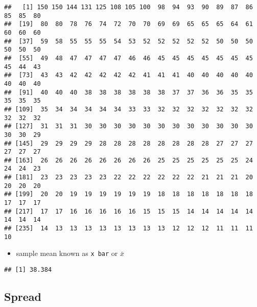 \documentclass[
]{book}
\newenvironment{Shaded}{\begin{snugshade}}{\end{snugshade}}
\newcommand{\AttributeTok}[1]{\textcolor[rgb]{0.77,0.63,0.00}{#1}}
\newcommand{\ConstantTok}[1]{\textcolor[rgb]{0.00,0.00,0.00}{#1}}
\newcommand{\FunctionTok}[1]{\textcolor[rgb]{0.00,0.00,0.00}{#1}}
\newcommand{\NormalTok}[1]{#1}
\newcommand{\SpecialCharTok}[1]{\textcolor[rgb]{0.00,0.00,0.00}{#1}}
\providecommand{\tightlist}{%
  \setlength{\itemsep}{0pt}\setlength{\parskip}{0pt}}
\theoremstyle{definition}
\theoremstyle{definition}
\theoremstyle{definition}
\theoremstyle{definition}
\theoremstyle{remark}
\begin{document}
\begin{Shaded}
\end{Shaded}

\begin{verbatim}
##   [1] 150 150 144 131 125 108 105 100  98  94  93  90  89  87  86  85  85  80
##  [19]  80  80  78  76  74  72  70  70  69  69  65  65  65  64  61  60  60  60
##  [37]  59  58  55  55  55  54  53  52  52  52  52  52  50  50  50  50  50  50
##  [55]  49  48  47  47  47  47  46  46  45  45  45  45  45  45  45  45  44  43
##  [73]  43  43  42  42  42  42  42  41  41  41  40  40  40  40  40  40  40  40
##  [91]  40  40  40  38  38  38  38  38  38  37  37  36  36  35  35  35  35  35
## [109]  35  34  34  34  34  34  33  33  32  32  32  32  32  32  32  32  32  32
## [127]  31  31  31  30  30  30  30  30  30  30  30  30  30  30  30  30  30  29
## [145]  29  29  29  29  28  28  28  28  28  28  28  28  27  27  27  27  27  27
## [163]  26  26  26  26  26  26  26  26  25  25  25  25  25  25  24  24  24  23
## [181]  23  23  23  23  23  22  22  22  22  22  22  21  21  21  20  20  20  20
## [199]  20  20  19  19  19  19  19  19  18  18  18  18  18  18  18  17  17  17
## [217]  17  17  16  16  16  16  16  15  15  15  14  14  14  14  14  14  14  14
## [235]  14  13  13  13  13  13  13  13  13  12  12  12  11  11  11  10
\end{verbatim}

\begin{itemize}
\tightlist
\item
  sample mean known as \texttt{x\ bar} or \(\bar{x}\)
\end{itemize}

\begin{Shaded}
\end{Shaded}

\begin{verbatim}
## [1] 38.384
\end{verbatim}

\hypertarget{spread}{%
\subsection{Spread}\label{spread}}
\end{document}

